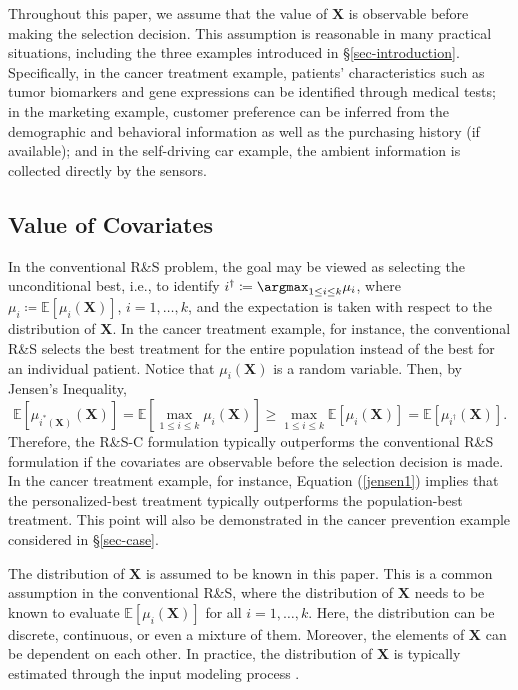\documentclass[ijoc,nonblindrev]{informs3}
\def\E{\mathbb{E}}
\def\bX{{\bm X}}
\begin{document}
\begin{remark}
Throughout this paper, we assume that the value of $\bX$ is observable before making the selection decision.
This assumption is reasonable in many practical situations, including the three examples introduced in \S \ref{sec-introduction}.
Specifically, in the cancer treatment example, patients' characteristics such as tumor biomarkers and gene expressions can be identified through medical tests;
in the marketing example, customer preference can be inferred from the
demographic and behavioral information as well as the purchasing history (if available);
and in the self-driving car example, the ambient information is collected directly by the sensors.
\end{remark}

\subsection{Value of Covariates}

In the conventional R\&S problem, the goal may be viewed as selecting the unconditional best, i.e., to identify $i^\dagger \coloneqq \argmax_{1\leq i\leq k} \mu_i$, where $\mu_i \coloneqq \E[\mu_i(\bX)]$, $i=1,\ldots,k$,
and the expectation is taken with respect to the distribution of $\bX$.
In the cancer treatment example, for instance, the conventional R\&S selects the best treatment for the entire population instead of the best for an individual patient.
Notice that
$\mu_i(\bX)$ is a random variable.
Then, by Jensen's Inequality,
\begin{equation}\label{jensen1}
\E[\mu_{i^*(\bX)}(\bX)]
= \E \left[ \max_{1\leq i\leq k} \mu_i(\bX) \right] \geq \max_{1\leq i\leq k}  \E \left[ \mu_i(\bX) \right]
= \E[\mu_{i^\dagger}(\bX)].
\end{equation}
Therefore, the R\&S-C formulation typically outperforms the conventional R\&S formulation if the covariates are observable before the selection decision is made.
In the cancer treatment example, for instance, Equation (\ref{jensen1}) implies that the personalized-best treatment typically outperforms the population-best treatment.
This point will also be demonstrated in the cancer prevention example considered in \S \ref{sec-case}.


\begin{remark}
The distribution of $\bX$ is assumed to be known in this paper.
This is a common assumption in the conventional R\&S, where the distribution of $\bX$ needs to be known to evaluate $\E[\mu_i(\bX)]$ for all $i=1,\ldots,k$.
Here, the distribution can be discrete, continuous, or even a mixture of them.
Moreover, the elements of $\bX$ can be dependent on each other.
In practice, the distribution of $\bX$ is typically estimated through the  input modeling process \citep{law2000simulation}.
\end{remark}
\end{document}
